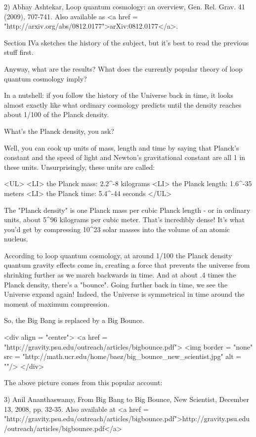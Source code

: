 2) Abhay Ashtekar, Loop quantum cosmology: an overview, 
Gen. Rel. Grav. 41 (2009), 707-741.  Also available as 
<a href = "http://arxiv.org/abs/0812.0177">arXiv:0812.0177</a>.

Section IVa sketches the history of the subject, but it's best to
read the previous stuff first.

Anyway, what are the results?  What does the currently popular theory
of loop quantum cosmology imply?

In a nutshell: if you follow the history of the Universe back in time,
it looks almost exactly like what ordinary cosmology predicts until
the density reaches about 1/100 of the Planck density.

What's the Planck density, you ask?

Well, you can cook up units of mass, length and time by saying that
Planck's constant and the speed of light and Newton's gravitational
constant are all 1 in these units.  Unsurprisingly, these units are
called:

<UL>
<LI>
the Planck mass: 2.2^{-8} kilograms
<LI>
the Planck length: 1.6^{-35} meters
<LI>
the Planck time: 5.4^{-44} seconds
</UL>

The "Planck density" is one Planck mass per cubic Planck
length - or in ordinary units, about 5^{96} kilograms
per cubic meter.  That's incredibly dense!  It's what you'd get by
compressing 10^{23} solar masses into the volume of an atomic
nucleus.


 According to loop quantum cosmology, at around 1/100 the Planck
density quantum gravity effects come in, creating a force that
prevents the universe from shrinking further as we march backwards in
time.  And at about .4 times the Planck density, there's a
"bounce".  Going further back in time, we see the Universe
expand again!  Indeed, the Universe is symmetrical in time around the
moment of maximum compression.

So, the Big Bang is replaced by a Big Bounce.  

<div align = "center">
<a href = "http://gravity.psu.edu/outreach/articles/bigbounce.pdf">
<img border = "none" src = "http://math.ucr.edu/home/baez/big_bounce_new_scientist.jpg" alt = ""/>
</div>

The above picture comes from this popular account:

3) Anil Ananthaswamy, From Big Bang to Big Bounce, New Scientist,
December 13, 2008, pp. 32-35.  Also available at
<a href = "http://gravity.psu.edu/outreach/articles/bigbounce.pdf">http://gravity.psu.edu/outreach/articles/bigbounce.pdf</a>

